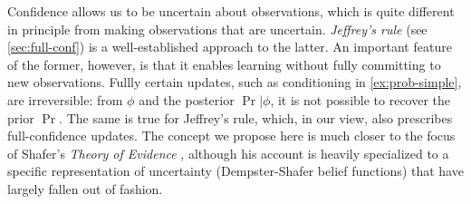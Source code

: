 Confidence allows us to be uncertain about observations,
which is quite different in principle from making observations that are uncertain.
\emph{Jeffrey's rule} \parencite{Jeffrey68} (see \cref{sec:full-conf}) is a well-established approach to the latter.
An important feature of the former, however, is that it enables
learning without fully committing to new observations.
Fullly certain updates, such as conditioning in \cref{ex:prob-simple}, are irreversible: 
from $\phi$ and the posterior $\Pr|\phi$, it is not possible to recover the prior $\Pr$.
The same is true for Jeffrey's rule,
which, in our view, also prescribes full-confidence updates. 
%
The concept we propose here is much closer to 
the focus of Shafer's \emph{Theory of Evidence} \cite{shafer1976mathematical},
although his account is heavily specialized to a specific representation of uncertainty (Dempster-Shafer belief functions)
that have largely fallen out of fashion.


